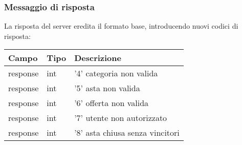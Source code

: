 \subsubsection{Messaggio di risposta}
La risposta del server eredita il formato base, introducendo nuovi codici di risposta:\\
\begin{tabular}{|l | l | l |}
\hline
Campo & Tipo & Descrizione \\ \hline
response & int & '4' categoria non valida \\ \hline
response & int & '5' asta non valida\\ \hline
response & int &  '6' offerta non valida\\ \hline
response & int &  '7' utente non autorizzato\\ \hline
response & int &  '8' asta chiusa senza vincitori\\ \hline
\end{tabular} \\